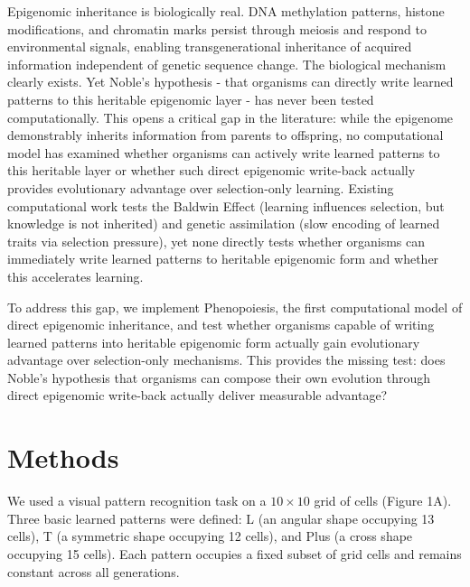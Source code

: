 \documentclass[11pt]{article}
\begin{document}
Epigenomic inheritance is biologically real. DNA methylation patterns, histone modifications, and chromatin marks persist through meiosis and respond to environmental signals, enabling transgenerational inheritance of acquired information independent of genetic sequence change\citep{Pembrey2006,Rakyan2002,Waterland2007,Gibney2010,Jablonka2014}. The biological mechanism clearly exists. Yet Noble's hypothesis - that organisms can directly write learned patterns to this heritable epigenomic layer - has never been tested computationally. This opens a critical gap in the literature: while the epigenome demonstrably inherits information from parents to offspring, no computational model has examined whether organisms can actively write learned patterns to this heritable layer or whether such direct epigenomic write-back actually provides evolutionary advantage over selection-only learning. Existing computational work tests the Baldwin Effect (learning influences selection, but knowledge is not inherited)\citep{Baldwin1896,HintonNowlan1987,Suzuki2007} and genetic assimilation (slow encoding of learned traits via selection pressure), yet none directly tests whether organisms can immediately write learned patterns to heritable epigenomic form and whether this accelerates learning.

To address this gap, we implement Phenopoiesis, the first computational model of direct epigenomic inheritance, and test whether organisms capable of writing learned patterns into heritable epigenomic form actually gain evolutionary advantage over selection-only mechanisms. This provides the missing test: does Noble's hypothesis that organisms can compose their own evolution through direct epigenomic write-back actually deliver measurable advantage?

\newpage{}

\section*{Methods}


We used a visual pattern recognition task on a $10 \times 10$ grid of cells (Figure 1A). Three basic learned patterns were defined: L (an angular shape occupying 13 cells), T (a symmetric shape occupying 12 cells), and Plus (a cross shape occupying 15 cells). Each pattern occupies a fixed subset of grid cells and remains constant across all generations.
\end{document}
